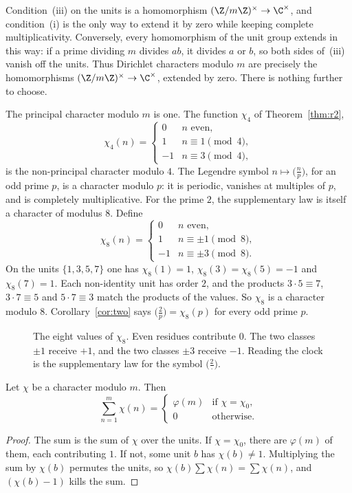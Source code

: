 Condition~(iii) on the units is a homomorphism $(\Z/m\Z)^\times\to\C^\times$, and condition~(i) is the only way to extend it by zero while keeping complete multiplicativity. Conversely, every homomorphism of the unit group extends in this way: if a prime dividing $m$ divides $ab$, it divides $a$ or $b$, so both sides of~(iii) vanish off the units. Thus Dirichlet characters modulo $m$ are precisely the homomorphisms $(\Z/m\Z)^\times\to\C^\times$, extended by zero. There is nothing further to choose.

\begin{examplex}
The principal character modulo $m$ is one. The function $\chi_4$ of Theorem~\ref{thm:r2},
\[
\chi_4(n)=\begin{cases}
0&n\text{ even},\\
1&n\equiv1\pmod4,\\
-1&n\equiv3\pmod4,
\end{cases}
\]
is the non-principal character modulo $4$. The Legendre symbol $n\mapsto\bigl(\frac np\bigr)$, for an odd prime $p$, is a character modulo $p$: it is periodic, vanishes at multiples of $p$, and is completely multiplicative. For the prime $2$, the supplementary law is itself a character of modulus $8$. Define
\[
\chi_8(n)=\begin{cases}
0&n\text{ even},\\
1&n\equiv\pm1\pmod8,\\
-1&n\equiv\pm3\pmod8.
\end{cases}
\]
On the units $\{1,3,5,7\}$ one has $\chi_8(1)=1$, $\chi_8(3)=\chi_8(5)=-1$ and $\chi_8(7)=1$. Each non-identity unit has order $2$, and the products $3\cdot5\equiv7$, $3\cdot7\equiv5$ and $5\cdot7\equiv3$ match the products of the values. So $\chi_8$ is a character modulo $8$. Corollary~\ref{cor:two} says $\bigl(\frac2p\bigr)=\chi_8(p)$ for every odd prime $p$.
\end{examplex}

\begin{figure}[ht]
\centering
{}
\caption{The eight values of $\chi_8$. Even residues contribute $0$. The two classes $\pm1$ receive $+1$, and the two classes $\pm3$ receive $-1$. Reading the clock is the supplementary law for the symbol $\bigl(\frac2{\cdot}\bigr)$.}
\label{fig:t1-chi8}
\end{figure}

\begin{proposition}\label{prop:t1-charsum}
Let $\chi$ be a character modulo $m$. Then
\[
\sum_{n=1}^m\chi(n)=\begin{cases}\varphi(m)&\text{if }\chi=\chi_0,\\0&\text{otherwise.}\end{cases}
\]
\end{proposition}
\begin{proof}
The sum is the sum of $\chi$ over the units. If $\chi=\chi_0$, there are $\varphi(m)$ of them, each contributing $1$. If not, some unit $b$ has $\chi(b)\ne1$. Multiplying the sum by $\chi(b)$ permutes the units, so $\chi(b)\sum\chi(n)=\sum\chi(n)$, and $(\chi(b)-1)$ kills the sum.
\end{proof}

